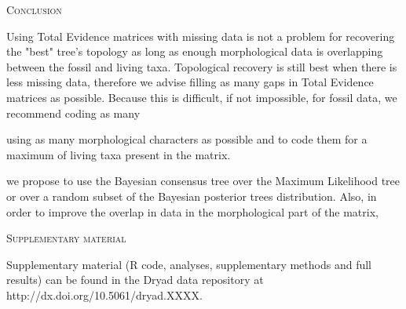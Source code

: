\documentclass[12pt,letterpaper]{article}
\renewcommand{\section}[1]{%
\bigskip
\begin{center}
\begin{Large}
\normalfont\scshape #1
\medskip
\end{Large}
\end{center}}
\begin{document}
%
%

\section{Conclusion}

Using Total Evidence matrices with missing data is not a problem for recovering the "best" tree's topology as long as enough morphological data is overlapping between the fossil and living taxa. %
Topological recovery is still best when there is less missing data, therefore we advise filling as many gaps in Total Evidence matrices as possible. Because this is difficult, if not impossible, for fossil data, we recommend coding as many


using as many morphological characters as possible and to code them for a maximum of living taxa present in the matrix.


we propose to use the Bayesian consensus tree over the Maximum Likelihood tree or over a random subset of the Bayesian posterior trees distribution. Also, in order to improve the overlap in data in the morphological part of the matrix, 


%
%
\section{Supplementary material}
Supplementary material (R code, analyses, supplementary methods and full results) can be found in the Dryad data repository at http://dx.doi.org/10.5061/dryad.XXXX. %
\end{document}
